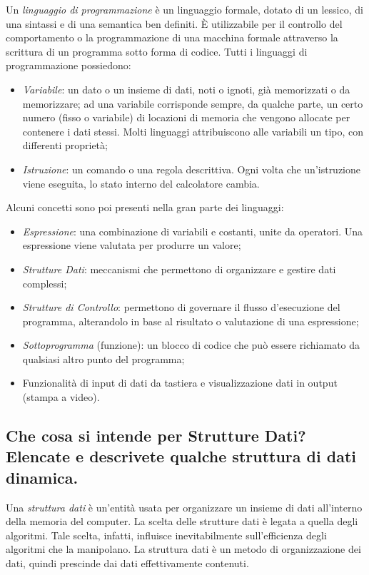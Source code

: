Un  \emph{linguaggio di programmazione} è un linguaggio formale, dotato di un lessico, di una sintassi e di una semantica ben definiti. È utilizzabile per il controllo del comportamento o la programmazione di una macchina formale attraverso la scrittura di un programma sotto forma di codice.  Tutti i linguaggi di programmazione possiedono:
\begin{itemize}
	\item
\emph{Variabile}: un dato o un insieme di dati, noti o ignoti, già memorizzati o da memorizzare; ad una variabile corrisponde sempre, da qualche parte, un certo numero (fisso o variabile) di locazioni di memoria che vengono allocate per contenere i dati stessi. Molti linguaggi attribuiscono alle variabili un tipo, con differenti proprietà;
	\item
\emph{Istruzione}: un comando o una regola descrittiva. Ogni volta che un'istruzione viene eseguita, lo stato interno del calcolatore cambia.
\end{itemize}
Alcuni  concetti sono poi presenti nella gran parte dei linguaggi:
\begin{itemize}
	\item
\emph{Espressione}: una combinazione di variabili e costanti, unite da operatori. Una espressione viene valutata per produrre un valore;
	\item
\emph{Strutture Dati}: meccanismi che permettono di organizzare e gestire dati complessi;
	\item
\emph{Strutture di Controllo}: permettono di governare il flusso d'esecuzione del programma, alterandolo in base al risultato o valutazione di una espressione;
	\item
\emph{Sottoprogramma} (funzione): un blocco di codice che può essere richiamato da qualsiasi altro punto del programma;
	\item
Funzionalità di input di dati da tastiera e visualizzazione dati in output (stampa a video).
\end{itemize}

	\subsection{Che cosa si intende per Strutture Dati? Elencate e descrivete qualche struttura di dati dinamica.}
	\label{subsec:strutdat}

Una \emph{struttura dati} è un'entità usata per organizzare un insieme di dati all'interno della memoria del computer. La scelta delle strutture dati è legata a quella degli algoritmi. Tale scelta, infatti, influisce inevitabilmente sull'efficienza degli algoritmi che la manipolano. La struttura dati è un metodo di organizzazione dei dati, quindi prescinde dai dati effettivamente contenuti.

